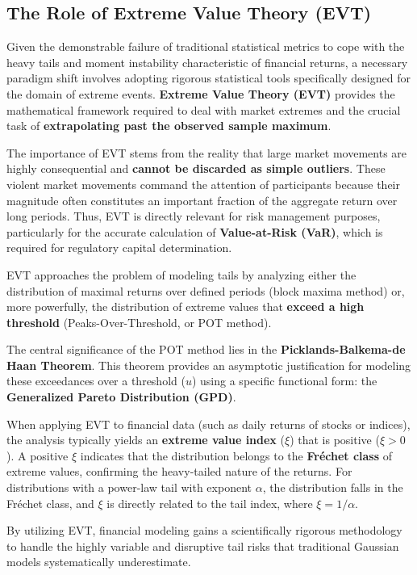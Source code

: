 \documentclass{ieeetj}
\begin{document}
\subsection{The Role of Extreme Value Theory (EVT)}

Given the demonstrable failure of traditional statistical metrics to cope with the heavy tails and moment instability characteristic of financial returns, a necessary paradigm shift involves adopting rigorous statistical tools specifically designed for the domain of extreme events. \textbf{Extreme Value Theory (EVT)} provides the mathematical framework required to deal with market extremes and the crucial task of \textbf{extrapolating past the observed sample maximum}.

The importance of EVT stems from the reality that large market movements are highly consequential and \textbf{cannot be discarded as simple outliers}. These violent market movements command the attention of participants because their magnitude often constitutes an important fraction of the aggregate return over long periods. Thus, EVT is directly relevant for risk management purposes, particularly for the accurate calculation of \textbf{Value-at-Risk (VaR)}, which is required for regulatory capital determination.

EVT approaches the problem of modeling tails by analyzing either the distribution of maximal returns over defined periods (block maxima method) or, more powerfully, the distribution of extreme values that \textbf{exceed a high threshold} (Peaks-Over-Threshold, or POT method).

The central significance of the POT method lies in the \textbf{Picklands-Balkema-de Haan Theorem}. This theorem provides an asymptotic justification for modeling these exceedances over a threshold ($u$) using a specific functional form: the \textbf{Generalized Pareto Distribution (GPD)}.

When applying EVT to financial data (such as daily returns of stocks or indices), the analysis typically yields an \textbf{extreme value index} ($\xi$) that is positive ($\xi>0$). A positive $\xi$ indicates that the distribution belongs to the \textbf{Fréchet class} of extreme values, confirming the heavy-tailed nature of the returns. For distributions with a power-law tail with exponent $\alpha$, the distribution falls in the Fréchet class, and $\xi$ is directly related to the tail index, where $\xi=1/\alpha$.

By utilizing EVT, financial modeling gains a scientifically rigorous methodology to handle the highly variable and disruptive tail risks that traditional Gaussian models systematically underestimate.
\end{document}
